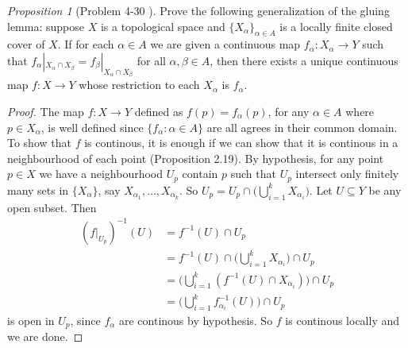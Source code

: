 \documentclass[a4paper]{article}
\theoremstyle{remark}
\newtheorem{prop}{Proposition}
\newcommand{\subhim}{\subseteq} %
\begin{document}
\begin{prop}[Problem 4-30 \cite{LeeTM}]
	Prove the following generalization of the gluing lemma: suppose $X$ is a topological space and $\{X_{\alpha}\}_{\alpha \in A}$ is a locally finite closed cover of $X$. If for each $\alpha \in A$ we are given a continuous map $f_{\alpha}: X_{\alpha} \to Y$ such that $f_{\alpha}|_{X_{\alpha}\cap X_{\beta}} = f_{\beta}|_{X_{\alpha}\cap X_{\beta}}$ for all $\alpha,\beta \in A$, then there exists a unique continuous map $f: X\to Y$ whose restriction to each $X_{\alpha}$ is $f_{\alpha}$.
\end{prop}
\begin{proof}
	The map $f: X\to Y$ defined as $f(p) = f_{\alpha}(p)$, for any $\alpha \in A$ where $p \in X_{\alpha}$, is well defined since $\{f_{\alpha} : \alpha \in A\}$ are all agrees in their common domain. To show that $f$ is continous, it is enough if we can show that it is continous in a neighbourhood of each point (Proposition 2.19). By hypothesis, for any point $p \in X$ we have a neighbourhood $U_p$ contain $p$ such that $U_p$ intersect only finitely many sets in $\{X_{\alpha}\}$, say $X_{\alpha_1},\dots,X_{\alpha_k}$. So $U_p = U_p \cap \big( \bigcup_{i=1}^k X_{\alpha_i} \big)$. Let $U\subhim Y$ be any open subset. Then 
	\begin{align*}
	(f|_{U_p})^{-1}(U) &= f^{-1}(U) \cap U_p\\
	&= f^{-1}(U) \cap \Big( \bigcup_{i=1}^k X_{\alpha_i} \Big) \cap U_p\\
	&=\Big( \bigcup_{i=1}^k (f^{-1}(U) \cap X_{\alpha_i} )  \Big) \cap U_p \\
	&= \Big( \bigcup_{i=1}^k f_{\alpha_i}^{-1}(U)  \Big) \cap U_p
	\end{align*}
	is open in $U_p$, since $f_{\alpha}$ are continous by hypothesis. So $f$ is continous locally and we are done.
\end{proof}
\end{document}
